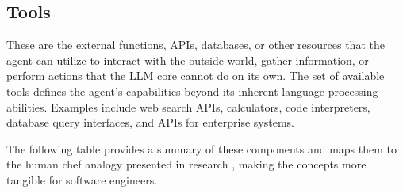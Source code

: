 \subsection*{Tools}
These are the external functions, APIs, databases, or other resources that the agent can utilize to interact with the outside world, gather information, 
or perform actions that the LLM core cannot do on its own. The set of available tools defines the agent's capabilities beyond its inherent language processing 
abilities. Examples include web search APIs, calculators, code interpreters, database query interfaces, and APIs for enterprise systems.

The following table provides a summary of these components and maps them to the human chef analogy presented in research , making the concepts more 
tangible for software engineers.

